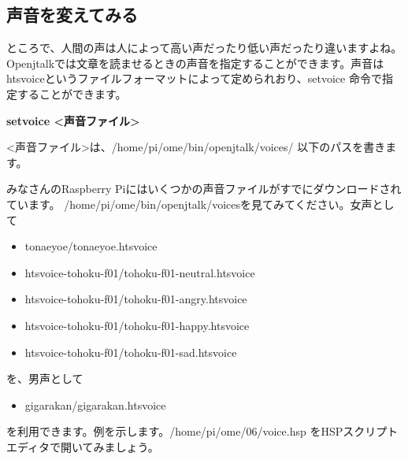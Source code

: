 \documentclass[a4paper,dvipdfmx]{jarticle}
\newcommand\liststyleLv{%
\renewcommand\labelitemi{{\textbullet}}
\renewcommand\labelitemii{${\circ}$}
\renewcommand\labelitemiii{${\blacksquare}$}
\renewcommand\labelitemiv{{\textbullet}}
}
\newcommand\liststyleLvi{%
\renewcommand\labelitemi{{\textbullet}}
\renewcommand\labelitemii{${\circ}$}
\renewcommand\labelitemiii{${\blacksquare}$}
\renewcommand\labelitemiv{{\textbullet}}
}
\begin{document}
\subsection[声音を変えてみる]{声音を変えてみる}
{
ところで、人間の声は人によって高い声だったり低い声だったり違いますよね。Openjtalkでは文章を読ませるときの声音を指定することができます。声音はhtsvoiceというファイルフォーマットによって定められおり、setvoice
命令で指定することができます。}

{\ttfamily\bfseries
setvoice {\textless}声音ファイル{\textgreater}}


\bigskip

{
{\textless}声音ファイル{\textgreater}は、/home/pi/ome/bin/openjtalk/voices/
以下のパスを書きます。}

{
みなさんのRaspberry
Piにはいくつかの声音ファイルがすでにダウンロードされています。
/home/pi/ome/bin/openjtalk/voicesを見てみてください。女声として}

\liststyleLv
\begin{itemize}
\item {
tonaeyoe/tonaeyoe.htsvoice}
\item {
htsvoice-tohoku-f01/tohoku-f01-neutral.htsvoice}
\item {
htsvoice-tohoku-f01/tohoku-f01-angry.htsvoice}
\item {
htsvoice-tohoku-f01/tohoku-f01-happy.htsvoice}
\item {
htsvoice-tohoku-f01/tohoku-f01-sad.htsvoice}
\end{itemize}
{
を、男声として}

\liststyleLvi
\begin{itemize}
\item {
gigarakan/gigarakan.htsvoice}
\end{itemize}
{
を利用できます。例を示します。/home/pi/ome/06/voice.hsp
をHSPスクリプトエディタで開いてみましょう。}
\end{document}
